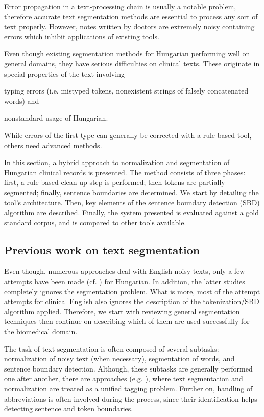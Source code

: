 
Error propagation in a text-processing chain is usually a notable problem, therefore accurate text segmentation methods are essential to process any sort of text properly.
However, notes written by doctors are extremely noisy containing errors which inhibit applications of existing tools.

Even though existing segmentation methods for Hungarian performing well on general domains, they have serious difficulties on clinical texts.
These originate in special properties of the text involving
\begin{inparaenum}
 \item typing errors (i.e. mistyped tokens, nonexistent strings of falsely concatenated words) and
 \item nonstandard usage of Hungarian.
\end{inparaenum}
While errors of the first type can generally be corrected with a rule-based tool, others need advanced methods. 

In this section, a hybrid approach to normalization and segmentation of Hungarian clinical records is presented. 
The method consists of three phases: first, a rule-based clean-up step is performed; then tokens are partially segmented; finally, sentence boundaries are determined. 
We start by detailing the tool's architecture. 
Then, key elements of the sentence boundary detection (SBD) algorithm are described. 
Finally, the system presented is evaluated against a gold standard corpus, and is compared to other tools available.

\subsection{Previous work on text segmentation}

Even though, numerous approaches deal with English noisy texts, only a few attempts have been made (cf. \cite{Siklosi2012,Siklosi2013,Siklosi2013b}) for Hungarian. In addition, the latter studies completely ignores the segmentation problem. What is more, most of the attempt attempts for clinical English also ignores the description of the tokenization/SBD algorithm applied. Therefore, we start with reviewing general segmentation techniques then continue on describing which of them are used successfully for the biomedical domain.

The task of text segmentation is often composed of several subtasks: normalization of noisy text (when necessary), segmentation of words, and sentence boundary detection.  
Although, these subtasks are generally performed one after another, there are approaches (e.g. \cite{zhu2007unified}), where text segmentation and normalization are treated as a unified tagging problem. Further on, handling of abbreviations is often involved during the process, since their identification helps detecting sentence and token boundaries.

